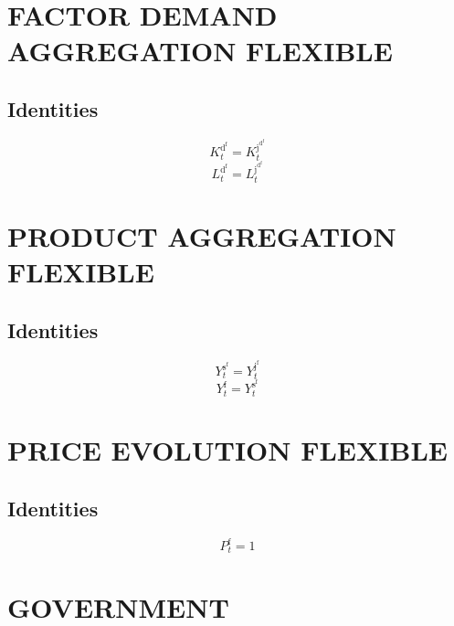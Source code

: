 \section{FACTOR DEMAND AGGREGATION FLEXIBLE}

\subsection{Identities}

\begin{equation}
K^{\mathrm{d}^{\mathrm{f}}}_{t} = K^{\mathrm{j}^{\mathrm{d}^{\mathrm{f}}}}_{t}
\end{equation}
\begin{equation}
L^{\mathrm{d}^{\mathrm{f}}}_{t} = L^{\mathrm{j}^{\mathrm{d}^{\mathrm{f}}}}_{t}
\end{equation}




\section{PRODUCT AGGREGATION FLEXIBLE}

\subsection{Identities}

\begin{equation}
Y^{\mathrm{s}^{\mathrm{f}}}_{t} = Y^{\mathrm{j}^{\mathrm{f}}}_{t}
\end{equation}
\begin{equation}
Y^{\mathrm{f}}_{t} = Y^{\mathrm{s}^{\mathrm{f}}}_{t}
\end{equation}




\section{PRICE EVOLUTION FLEXIBLE}

\subsection{Identities}

\begin{equation}
P^{\mathrm{f}}_{t} = 1
\end{equation}




\section{GOVERNMENT}


